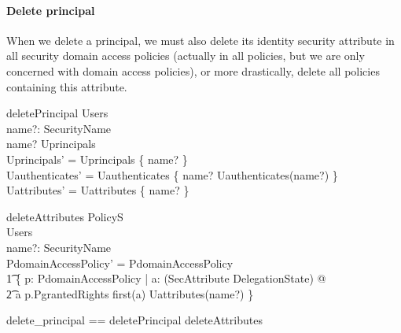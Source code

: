 \paragraph{Delete principal} 
When we delete a principal, we must also delete its identity security attribute
in all security domain access policies (actually in all policies, but we are
only concerned with domain access policies), or more drastically, delete all
policies containing this attribute.
\begin{schema}{deletePrincipal}
  \Delta Users \\
  name?: SecurityName \\
  \where
  name? \in Uprincipals \\
  Uprincipals' = Uprincipals \setminus \{ name? \} \\
  Uauthenticates' = Uauthenticates \setminus \{ name? \mapsto
  Uauthenticates(name?) \} \\ 
  Uattributes' = Uattributes \oplus \{ name? \mapsto \emptyset \} \\
\end{schema}
\begin{schema}{deleteAttributes}
  \Delta PolicyS \\
  Users \\
  name?: SecurityName \\
  \where
  PdomainAccessPolicy' = PdomainAccessPolicy \nrres \\
  \t1 \{ p: \ran PdomainAccessPolicy | \exists a: (SecAttribute \cross
  DelegationState) @  \\
  \t2 a \in \dom p.PgrantedRights \land first(a) \in Uattributes(name?) \} \\
\end{schema}
\begin{zed}
  delete\_principal == deletePrincipal \land deleteAttributes \\
\end{zed}


